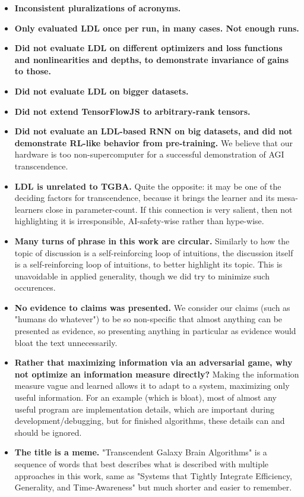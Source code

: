 \documentclass{article}
\begin{document}
\begin{itemize}
\item \textbf{Inconsistent pluralizations of acronyms.}
\item \textbf{Only evaluated LDL once per run, in many cases. Not enough runs.}
\item \textbf{Did not evaluate LDL on different optimizers and loss functions and nonlinearities and depths, to demonstrate invariance of gains to those.}
\item \textbf{Did not evaluate LDL on bigger datasets.}
\item \textbf{Did not extend TensorFlowJS to arbitrary-rank tensors.}
\item \textbf{Did not evaluate an LDL-based RNN on big datasets, and did not demonstrate RL-like behavior from pre-training.} We believe that our hardware is too non-supercomputer for a successful demonstration of AGI transcendence.
\item \textbf{LDL is unrelated to TGBA.} Quite the opposite: it may be one of the deciding factors for transcendence, because it brings the learner and its mesa-learners close in parameter-count. If this connection is very salient, then not highlighting it is irresponsible, AI-safety-wise rather than hype-wise.
\item \textbf{Many turns of phrase in this work are circular.} Similarly to how the topic of discussion is a self-reinforcing loop of intuitions, the discussion itself is a self-reinforcing loop of intuitions, to better highlight its topic. This is unavoidable in applied generality, though we did try to minimize such occurences.
\item \textbf{No evidence to claims was presented.} We consider our claims (such as "humans do whatever") to be so non-specific that almost anything can be presented as evidence, so presenting anything in particular as evidence would bloat the text unnecessarily.
\item \textbf{Rather that maximizing information via an adversarial game, why not optimize an information measure directly?} Making the information measure vague and learned allows it to adapt to a system, maximizing only useful information. For an example (which is bloat), most of almost any useful program are implementation details, which are important during development/debugging, but for finished algorithms, these details can and should be ignored.
\item \textbf{The title is a meme.} "Transcendent Galaxy Brain Algorithms" is a sequence of words that best describes what is described with multiple approaches in this work, same as "Systems that Tightly Integrate Efficiency, Generality, and Time-Awareness" but much shorter and easier to remember.

\end{itemize}
\end{document}
